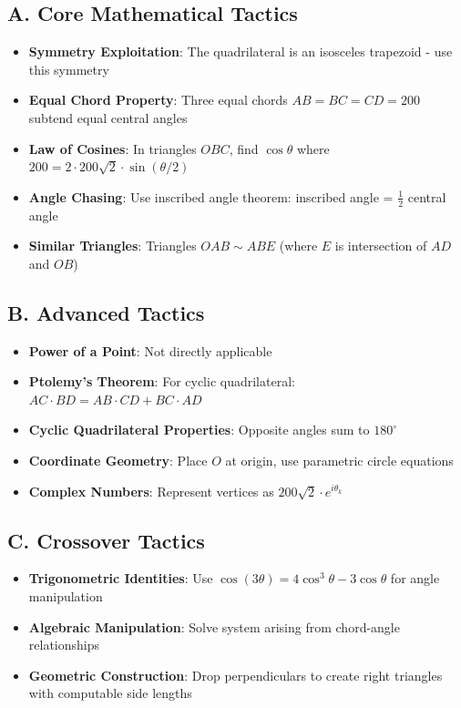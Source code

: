 \documentclass[12pt]{article}
\begin{document}
\begin{tacticalbox}
\subsection*{A. Core Mathematical Tactics}
\begin{itemize}[leftmargin=*]
    \item \textbf{Symmetry Exploitation}: The quadrilateral is an isosceles trapezoid - use this symmetry
    \item \textbf{Equal Chord Property}: Three equal chords $AB = BC = CD = 200$ subtend equal central angles
    \item \textbf{Law of Cosines}: In triangles $OBC$, find $\cos\theta$ where $200 = 2 \cdot 200\sqrt{2} \cdot \sin(\theta/2)$
    \item \textbf{Angle Chasing}: Use inscribed angle theorem: inscribed angle = $\frac{1}{2}$ central angle
    \item \textbf{Similar Triangles}: Triangles $OAB \sim ABE$ (where $E$ is intersection of $AD$ and $OB$)
\end{itemize}

\subsection*{B. Advanced Tactics}
\begin{itemize}[leftmargin=*]
    \item \textbf{Power of a Point}: Not directly applicable
    \item \textbf{Ptolemy's Theorem}: For cyclic quadrilateral: $AC \cdot BD = AB \cdot CD + BC \cdot AD$
    \item \textbf{Cyclic Quadrilateral Properties}: Opposite angles sum to $180^\circ$
    \item \textbf{Coordinate Geometry}: Place $O$ at origin, use parametric circle equations
    \item \textbf{Complex Numbers}: Represent vertices as $200\sqrt{2} \cdot e^{i\theta_k}$
\end{itemize}

\subsection*{C. Crossover Tactics}
\begin{itemize}[leftmargin=*]
    \item \textbf{Trigonometric Identities}: Use $\cos(3\theta) = 4\cos^3\theta - 3\cos\theta$ for angle manipulation
    \item \textbf{Algebraic Manipulation}: Solve system arising from chord-angle relationships
    \item \textbf{Geometric Construction}: Drop perpendiculars to create right triangles with computable side lengths
\end{itemize}
\end{tacticalbox}
\end{document}
